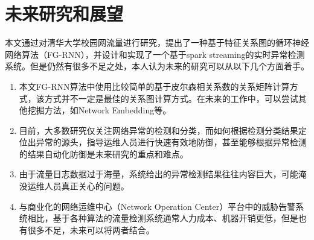 \section{未来研究和展望}
本文通过对清华大学校园网流量进行研究，提出了一种基于特征关系图的循环神经网络算法（FG-RNN），并设计和实现了一个基于spark streaming的实时异常检测系统。但是仍然有很多不足之处，本人认为未来的研究可以从以下几个方面着手。
\begin{enumerate}
    \item 本文FG-RNN算法中使用比较简单的基于皮尔森相关系数的关系矩阵计算方式，该方式并不一定是最佳的关系图计算方式。在未来的工作中，可以尝试其他挖掘方法，如Network Embedding等。
    \item 目前，大多数研究仅关注网络异常的检测和分类，而如何根据检测分类结果定位出异常的源头，指导运维人员进行快速有效地防御，甚至能够根据异常检测的结果自动化防御是未来研究的重点和难点。
    \item 由于流量日志数据过于海量，系统给出的异常检测结果往往内容巨大，可能淹没运维人员真正关心的问题。
    \item 与商业化的网络运维中心（Network Operation Center）平台中的威胁告警系统相比，基于各种算法的流量检测系统通常人力成本、机器开销更低，但是也有很多不足，未来可以将两者结合。
\end{enumerate}
